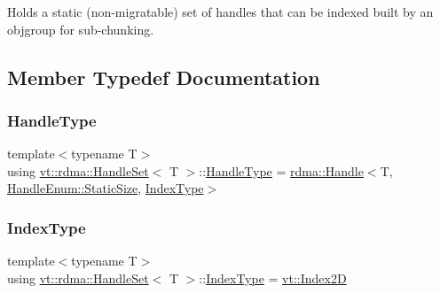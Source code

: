Holds a static (non-\/migratable) set of handles that can be indexed built by an objgroup for sub-\/chunking. 

\subsection{Member Typedef Documentation}
\mbox{\label{structvt_1_1rdma_1_1_handle_set_ab3a698ee86bae503dfa84617205b2dd9}} 
\subsubsection{\texorpdfstring{Handle\+Type}{HandleType}}
{\footnotesize\ttfamily template$<$typename T$>$ \\
using \hyperlink{structvt_1_1rdma_1_1_handle_set}{vt\+::rdma\+::\+Handle\+Set}$<$ T $>$\+::\hyperlink{structvt_1_1rdma_1_1_handle_set_ab3a698ee86bae503dfa84617205b2dd9}{Handle\+Type} =  \hyperlink{structvt_1_1rdma_1_1_handle}{rdma\+::\+Handle}$<$T, \hyperlink{namespacevt_1_1rdma_a0234ff19cfb3c04718cfdfd36b2d6d88a0c5c41d6a0319a61d3a5e8a060b7c4d7}{Handle\+Enum\+::\+Static\+Size}, \hyperlink{structvt_1_1rdma_1_1_handle_set_aa0dbb6a47c459fb4290f0ca96e573097}{Index\+Type}$>$}

\mbox{\label{structvt_1_1rdma_1_1_handle_set_aa0dbb6a47c459fb4290f0ca96e573097}} 
\subsubsection{\texorpdfstring{Index\+Type}{IndexType}}
{\footnotesize\ttfamily template$<$typename T$>$ \\
using \hyperlink{structvt_1_1rdma_1_1_handle_set}{vt\+::rdma\+::\+Handle\+Set}$<$ T $>$\+::\hyperlink{structvt_1_1rdma_1_1_handle_set_aa0dbb6a47c459fb4290f0ca96e573097}{Index\+Type} =  \hyperlink{namespacevt_a3bab786053b74a3d856fff1412ffa73a}{vt\+::\+Index2D}}

\mbox{\label{structvt_1_1rdma_1_1_handle_set_a81d333ec397f0becb9fe692e53145441}} 
